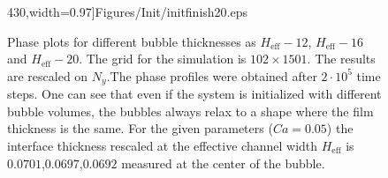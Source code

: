 \documentclass[preprint,12pt]{elsarticle}
\begin{document}
\begin{figure}
430,width=0.97\textwidth]{Figures/Init/initfinish20.eps}\\
\caption{Phase plots for different bubble thicknesses as
$H_{\mathrm{eff}}-12$, $H_{\mathrm{eff}}-16$ and
$H_{\mathrm{eff}}-20$. The grid for the simulation is $102 \times 1501$. The results are rescaled
on $N_y$.The phase
profiles were obtained after $2\cdot10^5$ time steps. One can see that even if the
system is initialized with different bubble volumes, the bubbles always relax
to a shape where the film thickness is the same. For the given parameters ($Ca=0.05$) the
interface thickness rescaled at the effective channel width $H_{\mathrm{eff}}$  is
$0.0701$,$0.0697$,$0.0692$ measured at the {\color{red} center of the bubble}.
\label{fig:different:initialization:widths}}
\end{figure}
\end{document}

